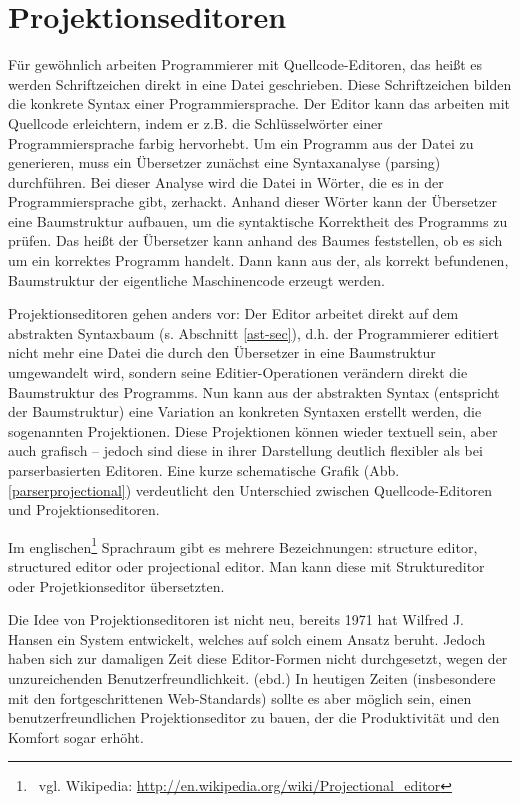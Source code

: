 
\section{Projektionseditoren}\label{Projektionseditoren-sec}
 
Für gewöhnlich arbeiten Programmierer mit Quellcode-Editoren, das heißt es werden Schriftzeichen direkt in eine Datei geschrieben. Diese Schriftzeichen bilden die konkrete Syntax einer Programmiersprache. Der Editor kann das arbeiten mit Quellcode erleichtern, indem er z.B. die Schlüsselwörter einer Programmiersprache farbig hervorhebt. Um ein Programm aus der Datei zu generieren, muss ein Übersetzer zunächst eine Syntaxanalyse (parsing) durchführen. Bei dieser Analyse wird die Datei in Wörter, die es in der Programmiersprache gibt, zerhackt. Anhand dieser Wörter kann der Übersetzer eine Baumstruktur aufbauen, um die syntaktische Korrektheit des Programms zu prüfen. Das heißt der Übersetzer kann anhand des Baumes feststellen, ob es sich um ein korrektes Programm handelt. Dann kann aus der, als korrekt befundenen, Baumstruktur der eigentliche Maschinencode erzeugt werden.

 
Projektionseditoren gehen anders vor: Der Editor arbeitet direkt auf dem abstrakten Syntaxbaum (s. Abschnitt \ref{ast-sec}), d.h. der Programmierer editiert nicht mehr eine Datei die durch den Übersetzer in eine Baumstruktur umgewandelt wird, sondern seine Editier-Operationen verändern direkt die Baumstruktur des Programms. \citep[S.~68]{Voelter} Nun kann aus der abstrakten Syntax (entspricht der Baumstruktur) eine Variation an konkreten Syntaxen erstellt werden, die sogenannten Projektionen. Diese Projektionen können wieder textuell sein, aber auch grafisch -- jedoch sind diese in ihrer Darstellung deutlich flexibler als bei parserbasierten Editoren. Eine kurze schematische Grafik (Abb. \ref{parserprojectional}) verdeutlicht den Unterschied zwischen Quellcode-Editoren und Projektionseditoren.

 
Im englischen\footnote{~vgl. Wikipedia: \url{http://en.wikipedia.org/wiki/Projectional\_editor}} Sprachraum gibt es mehrere Bezeichnungen: structure editor, structured editor oder projectional editor. Man kann diese mit Struktureditor oder Projetkionseditor übersetzten.

 
Die Idee von Projektionseditoren ist nicht neu, bereits 1971 hat Wilfred J. Hansen ein System entwickelt, welches auf solch einem Ansatz beruht. \citep[S.~91]{Gomolka} Jedoch haben sich zur damaligen Zeit diese Editor-Formen nicht durchgesetzt, wegen der unzureichenden Benutzerfreundlichkeit. (ebd.) In heutigen Zeiten (insbesondere mit den fortgeschrittenen Web-Standards) sollte es aber möglich sein, einen benutzerfreundlichen Projektionseditor zu bauen, der die Produktivität und den Komfort sogar erhöht.

